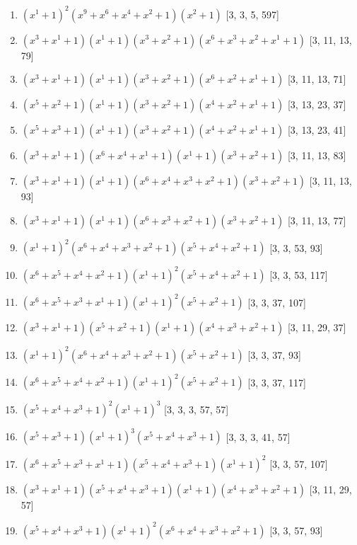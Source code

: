 \documentclass[10pt,twocolumn]{article}
\begin{document}
\begin{enumerate}
\item $(x^{1} + 1)^{2}(x^{9} + x^{6} + x^{4} + x^{2} + 1)(x^{2} + 1)$  [3, 3, 5, 597]
\item $(x^{3} + x^{1} + 1)(x^{1} + 1)(x^{3} + x^{2} + 1)(x^{6} + x^{3} + x^{2} + x^{1} + 1)$  [3, 11, 13, 79]
\item $(x^{3} + x^{1} + 1)(x^{1} + 1)(x^{3} + x^{2} + 1)(x^{6} + x^{2} + x^{1} + 1)$  [3, 11, 13, 71]
\item $(x^{5} + x^{2} + 1)(x^{1} + 1)(x^{3} + x^{2} + 1)(x^{4} + x^{2} + x^{1} + 1)$  [3, 13, 23, 37]
\item $(x^{5} + x^{3} + 1)(x^{1} + 1)(x^{3} + x^{2} + 1)(x^{4} + x^{2} + x^{1} + 1)$  [3, 13, 23, 41]
\item $(x^{3} + x^{1} + 1)(x^{6} + x^{4} + x^{1} + 1)(x^{1} + 1)(x^{3} + x^{2} + 1)$  [3, 11, 13, 83]
\item $(x^{3} + x^{1} + 1)(x^{1} + 1)(x^{6} + x^{4} + x^{3} + x^{2} + 1)(x^{3} + x^{2} + 1)$  [3, 11, 13, 93]
\item $(x^{3} + x^{1} + 1)(x^{1} + 1)(x^{6} + x^{3} + x^{2} + 1)(x^{3} + x^{2} + 1)$  [3, 11, 13, 77]
\item $(x^{1} + 1)^{2}(x^{6} + x^{4} + x^{3} + x^{2} + 1)(x^{5} + x^{4} + x^{2} + 1)$  [3, 3, 53, 93]
\item $(x^{6} + x^{5} + x^{4} + x^{2} + 1)(x^{1} + 1)^{2}(x^{5} + x^{4} + x^{2} + 1)$  [3, 3, 53, 117]
\item $(x^{6} + x^{5} + x^{3} + x^{1} + 1)(x^{1} + 1)^{2}(x^{5} + x^{2} + 1)$  [3, 3, 37, 107]
\item $(x^{3} + x^{1} + 1)(x^{5} + x^{2} + 1)(x^{1} + 1)(x^{4} + x^{3} + x^{2} + 1)$  [3, 11, 29, 37]
\item $(x^{1} + 1)^{2}(x^{6} + x^{4} + x^{3} + x^{2} + 1)(x^{5} + x^{2} + 1)$  [3, 3, 37, 93]
\item $(x^{6} + x^{5} + x^{4} + x^{2} + 1)(x^{1} + 1)^{2}(x^{5} + x^{2} + 1)$  [3, 3, 37, 117]
\item $(x^{5} + x^{4} + x^{3} + 1)^{2}(x^{1} + 1)^{3}$  [3, 3, 3, 57, 57]
\item $(x^{5} + x^{3} + 1)(x^{1} + 1)^{3}(x^{5} + x^{4} + x^{3} + 1)$  [3, 3, 3, 41, 57]
\item $(x^{6} + x^{5} + x^{3} + x^{1} + 1)(x^{5} + x^{4} + x^{3} + 1)(x^{1} + 1)^{2}$  [3, 3, 57, 107]
\item $(x^{3} + x^{1} + 1)(x^{5} + x^{4} + x^{3} + 1)(x^{1} + 1)(x^{4} + x^{3} + x^{2} + 1)$  [3, 11, 29, 57]
\item $(x^{5} + x^{4} + x^{3} + 1)(x^{1} + 1)^{2}(x^{6} + x^{4} + x^{3} + x^{2} + 1)$  [3, 3, 57, 93]

\end{enumerate}
\end{document}

